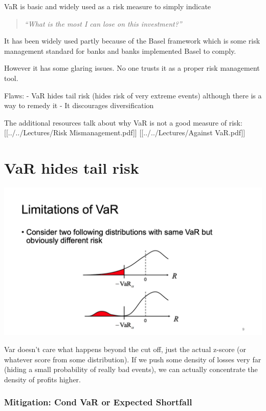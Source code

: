 \documentclass[
  oneside]{book}
\begin{document}
VaR is basic and widely used as a risk measure to simply indicate

\begin{quote}
\emph{``What is the most I can lose on this investment?''}
\end{quote}

It has been widely used partly because of the Basel framework which is some risk management standard for banks and banks implemented Basel to comply.

However it has some glaring issues. No one trusts it as a proper risk management tool.

Flaws:
- VaR hides tail risk (hides risk of very extreme events) although there is a way to remedy it
- It discourages diversification

The additional resources talk about why VaR is not a good measure of risk:
{[}{[}../../Lectures/Risk Mismanagement.pdf{]}{]}
{[}{[}../../Lectures/Against VaR.pdf{]}{]}

\hypertarget{var-hides-tail-risk}{%
\section{VaR hides tail risk}\label{var-hides-tail-risk}}

\includegraphics{Notes/Obsidian-Attachments/7-Risk-Management-2.png}

Var doesn't care what happens beyond the cut off, just the actual z-score (or whatever score from some distribution). If we push some density of losses very far (hiding a small probability of really bad events), we can actually concentrate the density of profits higher.

\hypertarget{mitigation-cond-var-or-expected-shortfall}{%
\subsubsection{Mitigation: Cond VaR or Expected Shortfall}\label{mitigation-cond-var-or-expected-shortfall}}
\end{document}
